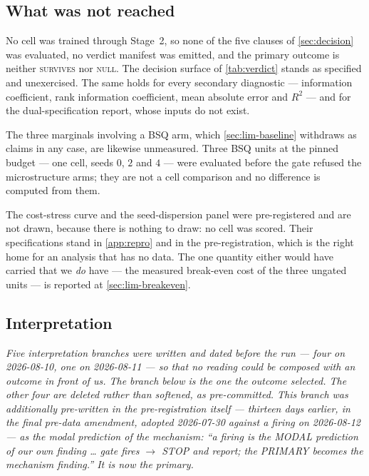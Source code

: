 \subsection{What was not reached}
\label{sec:res-primary}

No cell was trained through Stage~2, so none of the five clauses of \cref{sec:decision} was
evaluated, no verdict manifest was emitted, and the primary outcome is neither \textsc{survives}
nor \textsc{null}. The decision surface of \cref{tab:verdict} stands as specified and unexercised.
The same holds for every secondary diagnostic --- information coefficient, rank information
coefficient, mean absolute error and $R^2$ --- and for the dual-specification report, whose inputs
do not exist.

\label{sec:res-effects}
The three marginals involving a BSQ arm, which \cref{sec:lim-baseline} withdraws as claims in any
case, are likewise unmeasured. Three BSQ units at the pinned budget --- one cell, seeds $0$, $2$
and $4$ --- were evaluated before the gate refused the microstructure arms; they are not a cell
comparison and no difference is computed from them.

\label{sec:res-stress}
The cost-stress curve and the seed-dispersion panel were pre-registered and are not drawn, because
there is nothing to draw: no cell was scored. Their specifications stand in \cref{app:repro} and in
the pre-registration, which is the right home for an analysis that has no data. The one quantity
either would have carried that we \emph{do} have --- the measured break-even cost of the three
ungated units --- is reported at \cref{sec:lim-breakeven}.

\subsection{Interpretation}
\label{sec:res-interpretation}

\emph{Five interpretation branches were written and dated before the run --- four on 2026-08-10,
one on 2026-08-11 --- so that no reading could be composed with an outcome in front of us. The
branch below is the one the outcome selected. The other four are deleted rather than softened, as
pre-committed. This branch was additionally pre-written in the pre-registration itself --- thirteen
days earlier, in the final pre-data amendment, adopted 2026-07-30 against a firing on 2026-08-12
--- as the \emph{modal} prediction of the mechanism: ``a firing is the MODAL prediction of our
own finding \ldots{} gate fires $\rightarrow$ STOP and report; the PRIMARY becomes the mechanism
finding.'' It is now the primary.}

